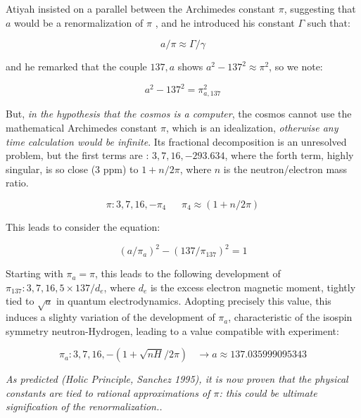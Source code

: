 \documentclass[a4paper,9pt]{article}
\begin{document}
Atiyah insisted on a parallel between the Archimedes constant $\pi$, suggesting that $a$ would be a renormalization of $\pi$ , and he introduced his constant $\Gamma$ such that:

\begin{equation}
a/\pi \approx \Gamma/\gamma
\end{equation}

and he remarked that the couple $137,a$ shows $a^2 - 137^2 \approx \pi^2$, so we note:

\begin{equation}
a^2 - 137^2 = \pi_{a,137}^2
\end{equation}

But, \textit {in the hypothesis that the cosmos is a computer}, the cosmos cannot use the mathematical Archimedes constant $\pi$, which is an idealization, \textit {otherwise any time calculation would be infinite}. Its fractional decomposition is an unresolved problem, but the first terms are : $3, 7, 16, -293.634$, where the forth term, highly singular, is so close (3 ppm) to $1 + n/2\pi$, where $n$ is the neutron/electron mass ratio.

\begin{equation}
\pi : 3, 7, 16, -\pi_4 ~~~~~~~   \pi_4 \approx (1+n/2\pi)
\end{equation}

This leads to consider the equation:

\begin{equation}
 (a/\pi_a)^2 - (137/\pi_{137})^2 = 1
\end{equation}  

Starting with $\pi_a = \pi$, this leads to the following development of $\pi_{137} : 3,7,16,5\times 137/d_e$, where $d_e$ is the excess electron magnetic moment, tightly tied to $\sqrt{a}$ in quantum electrodynamics. Adopting precisely this value, this induces a slighty variation of the development of $\pi_a$, characteristic of the isospin symmetry neutron-Hydrogen, leading to a value compatible with experiment:

\begin{equation}
\pi_a : 3, 7, 16, -(1+ \sqrt{nH}/2\pi) ~~~~ \rightarrow a \approx 137.035999095343
\end{equation}

\textit{As predicted (Holic Principle, Sanchez 1995), it is now proven that the physical constants are tied to rational approximations of $\pi$: this could be ultimate signification of the renormalization..}
 
\end{document}
